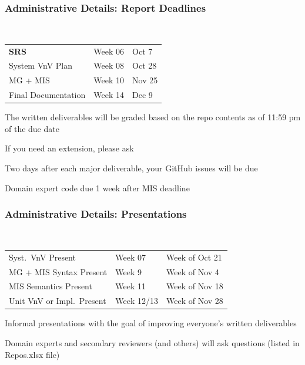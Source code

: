 \documentclass[t,12pt,numbers,fleqn]{beamer}
\begin{document}

\begin{frame}
\frametitle{Administrative Details: Report Deadlines}
~\newline
\begin{tabular}{l l l}
\textbf{SRS} & Week 06 & Oct 7\\
System VnV Plan & Week 08 & Oct 28\\
MG + MIS & Week 10 & Nov 25\\
Final Documentation & Week 14 & Dec 9\\
\end {tabular}

\bi
\item The written deliverables will be graded based on the repo contents as of
11:59 pm of the due date
\item If you need an extension, please ask
\item Two days after each major deliverable, your GitHub issues will be due
\item Domain expert code due 1 week after MIS deadline
\ei

\end{frame}


\begin{frame}
\frametitle{Administrative Details: Presentations}

~\newline
\begin{tabular}{l l l}
Syst.\ VnV Present & Week 07 & Week of Oct 21\\
MG + MIS Syntax Present & Week 9 & Week of Nov 4\\
MIS Semantics Present & Week 11 & Week of Nov 18\\
Unit VnV or Impl.\ Present & Week 12/13 & Week of Nov 28\\
\end {tabular}

\bi
\item Informal presentations with the goal of improving everyone's written
  deliverables
\item Domain experts and secondary reviewers (and others) will ask questions
  (listed in Repos.xlsx file)
\ei

\end{frame}

\end{document}
